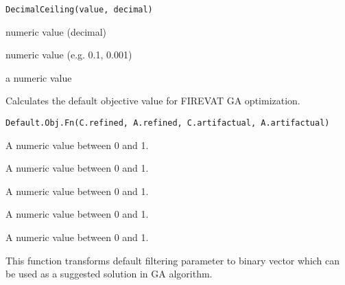 \documentclass[letterpaper]{book}
\begin{document}
%
\begin{Usage}
\begin{verbatim}
DecimalCeiling(value, decimal)
\end{verbatim}
\end{Usage}
%
\begin{Arguments}
\begin{ldescription}
\item[\code{value}] numeric value (decimal)

\item[\code{decimal}] numeric value (e.g. 0.1, 0.001)
\end{ldescription}
\end{Arguments}
%
\begin{Value}
a numeric value
\end{Value}
%
\begin{Description}\relax
Calculates the default objective value for FIREVAT GA optimization.
\end{Description}
%
\begin{Usage}
\begin{verbatim}
Default.Obj.Fn(C.refined, A.refined, C.artifactual, A.artifactual)
\end{verbatim}
\end{Usage}
%
\begin{Arguments}
\begin{ldescription}
\item[\code{C.refined}] A numeric value between 0 and 1.

\item[\code{A.refined}] A numeric value between 0 and 1.

\item[\code{C.artifactual}] A numeric value between 0 and 1.

\item[\code{A.artifactual}] A numeric value between 0 and 1.
\end{ldescription}
\end{Arguments}
%
\begin{Value}
A numeric value between 0 and 1.
\end{Value}
%
\begin{Description}\relax
This function transforms default filtering parameter to binary vector
which can be used as a suggested solution in GA algorithm.
\end{Description}
\end{document}
